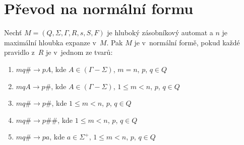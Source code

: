 
\section{Převod na normální formu}


\begin{Def}
Nechť $M = (Q,\Sigma,\Gamma, R, s, S , F)$ je hluboký zásobníkový automat
a $n$ je maximální hloubka expanze v~$M$.
Pak $M$ je v~normální formě, pokud každé pravidlo z~$R$ je v~jednom ze tvarů:

\begin{enumerate}
\renewcommand{\labelenumi}{(\roman{enumi})}
\item $mq\# \rightarrow pA$, kde $A \in (\Gamma - \Sigma)$, $m = n$, $p$, $q \in Q$
\item $mqA \rightarrow p\#$, kde $A \in (\Gamma - \Sigma)$, $1 \le m < n$, $p$, $q \in Q$
\item $mq\# \rightarrow p\#$, kde $1 \le m < n$, $p$, $q \in Q$
\item $mq\# \rightarrow p\#\#$, kde $1 \le m < n$, $p$, $q \in Q$
\item $mq\# \rightarrow pa$, kde $a \in {\Sigma}^+$, $1 \le m < n$, $p$, $q \in Q$

\end{enumerate}

\end{Def}


